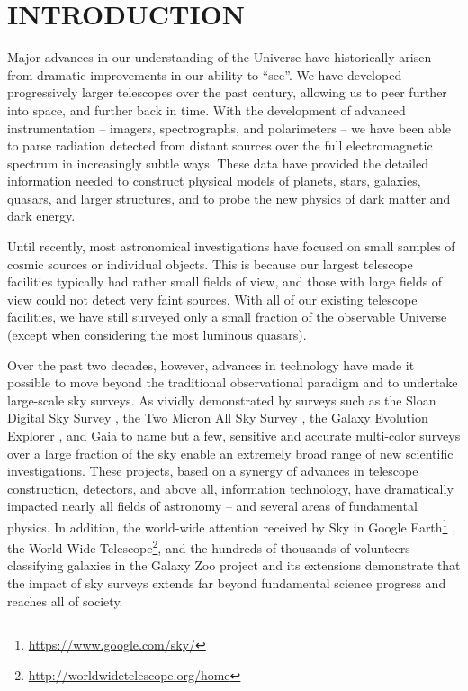 \section{INTRODUCTION} %

Major advances in our understanding of the Universe have historically arisen
from dramatic improvements in our ability to ``see''. We have developed
progressively larger telescopes over the past century, allowing us
to peer further into space, and further back in time. With the development of
advanced instrumentation -- imagers, spectrographs, and polarimeters -- we
have been able to parse radiation detected from distant sources over the
full electromagnetic spectrum in increasingly subtle ways.
These data have provided the detailed information needed to construct physical
models of planets, stars, galaxies, quasars, and larger structures, and to probe the
new physics of dark matter and dark energy.

Until recently, most astronomical investigations have focused on small samples
of cosmic sources or individual objects. This is because our largest telescope
facilities typically had rather small fields of view, and those with large
fields of view could not detect very faint sources. With all of our existing
telescope facilities, we have still surveyed only a small fraction of the
observable Universe (except when considering the most luminous quasars).

Over the past two decades, however, advances in technology have made it possible to
move beyond the traditional observational paradigm and to undertake large-scale
sky surveys. As vividly demonstrated by surveys such as the Sloan Digital Sky
Survey \citep[SDSS;][]{2000AJ....120.1579Y}, the Two Micron All Sky Survey \citep[2MASS;][]{2006AJ....131.1163S},
the Galaxy Evolution Explorer \citep[GALEX;][]{2005ApJ...619L...1M},
and Gaia \citep{2016A&A...595A...2G} to name but a few, sensitive and accurate
multi-color surveys over a large fraction of the sky enable an extremely broad range of
new scientific investigations. These projects, based on a synergy of advances in
telescope construction, detectors, and above all, information technology,
have dramatically impacted nearly all fields of astronomy
-- and several areas of fundamental physics. In addition, the world-wide attention
received by Sky in Google Earth\footnote{\url{https://www.google.com/sky/}}
\citep{2007arXiv0709.0752S}, the World Wide Telescope\footnote{\url{http://worldwidetelescope.org/home}},
and the hundreds of thousands of volunteers
classifying galaxies in the Galaxy Zoo project \citep{2011MNRAS.410..166L}
and its extensions demonstrate that the impact of sky surveys extends
far beyond fundamental science progress and reaches all of society.

